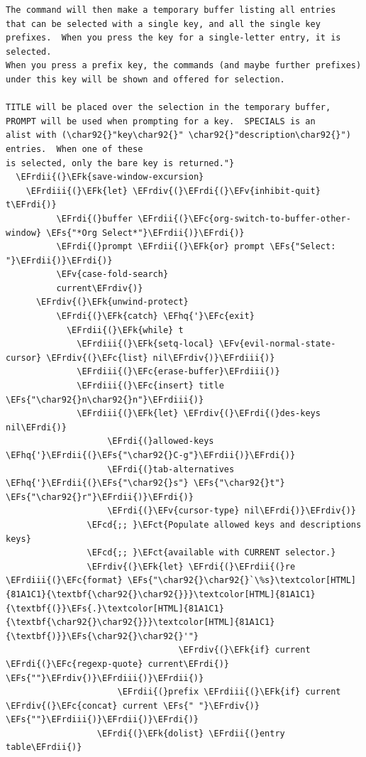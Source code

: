 \documentclass{scrartcl}
\newcommand{\EFk}[1]{\textcolor{EFk}{#1}} %
\newcommand{\EFs}[1]{\textcolor{EFs}{#1}} %
\newcommand{\EFct}[1]{\textcolor{EFct}{#1}} %
\newcommand{\EFc}[1]{\textcolor{EFc}{#1}} %
\newcommand{\EFv}[1]{\textcolor{EFv}{#1}} %
\newcommand{\EFcd}[1]{\textcolor{EFcd}{#1}} %
\newcommand{\EFhq}[1]{#1} %
\newcommand{\EFrdi}[1]{#1} %
\newcommand{\EFrdii}[1]{#1} %
\newcommand{\EFrdiii}[1]{#1} %
\newcommand{\EFrdiv}[1]{#1} %
\begin{document}
\begin{Code}
\begin{Verbatim}[]
The command will then make a temporary buffer listing all entries
that can be selected with a single key, and all the single key
prefixes.  When you press the key for a single-letter entry, it is selected.
When you press a prefix key, the commands (and maybe further prefixes)
under this key will be shown and offered for selection.

TITLE will be placed over the selection in the temporary buffer,
PROMPT will be used when prompting for a key.  SPECIALS is an
alist with (\char92{}"key\char92{}" \char92{}"description\char92{}") entries.  When one of these
is selected, only the bare key is returned."}
  \EFrdii{(}\EFk{save-window-excursion}
    \EFrdiii{(}\EFk{let} \EFrdiv{(}\EFrdi{(}\EFv{inhibit-quit} t\EFrdi{)}
          \EFrdi{(}buffer \EFrdii{(}\EFc{org-switch-to-buffer-other-window} \EFs{"*Org Select*"}\EFrdii{)}\EFrdi{)}
          \EFrdi{(}prompt \EFrdii{(}\EFk{or} prompt \EFs{"Select: "}\EFrdii{)}\EFrdi{)}
          \EFv{case-fold-search}
          current\EFrdiv{)}
      \EFrdiv{(}\EFk{unwind-protect}
          \EFrdi{(}\EFk{catch} \EFhq{'}\EFc{exit}
            \EFrdii{(}\EFk{while} t
              \EFrdiii{(}\EFk{setq-local} \EFv{evil-normal-state-cursor} \EFrdiv{(}\EFc{list} nil\EFrdiv{)}\EFrdiii{)}
              \EFrdiii{(}\EFc{erase-buffer}\EFrdiii{)}
              \EFrdiii{(}\EFc{insert} title \EFs{"\char92{}n\char92{}n"}\EFrdiii{)}
              \EFrdiii{(}\EFk{let} \EFrdiv{(}\EFrdi{(}des-keys nil\EFrdi{)}
                    \EFrdi{(}allowed-keys \EFhq{'}\EFrdii{(}\EFs{"\char92{}C-g"}\EFrdii{)}\EFrdi{)}
                    \EFrdi{(}tab-alternatives \EFhq{'}\EFrdii{(}\EFs{"\char92{}s"} \EFs{"\char92{}t"} \EFs{"\char92{}r"}\EFrdii{)}\EFrdi{)}
                    \EFrdi{(}\EFv{cursor-type} nil\EFrdi{)}\EFrdiv{)}
                \EFcd{;; }\EFct{Populate allowed keys and descriptions keys}
                \EFcd{;; }\EFct{available with CURRENT selector.}
                \EFrdiv{(}\EFk{let} \EFrdi{(}\EFrdii{(}re \EFrdiii{(}\EFc{format} \EFs{"\char92{}\char92{}`\%s}\textcolor[HTML]{81A1C1}{\textbf{\char92{}\char92{}}}\textcolor[HTML]{81A1C1}{\textbf{(}}\EFs{.}\textcolor[HTML]{81A1C1}{\textbf{\char92{}\char92{}}}\textcolor[HTML]{81A1C1}{\textbf{)}}\EFs{\char92{}\char92{}'"}
                                  \EFrdiv{(}\EFk{if} current \EFrdi{(}\EFc{regexp-quote} current\EFrdi{)} \EFs{""}\EFrdiv{)}\EFrdiii{)}\EFrdii{)}
                      \EFrdii{(}prefix \EFrdiii{(}\EFk{if} current \EFrdiv{(}\EFc{concat} current \EFs{" "}\EFrdiv{)} \EFs{""}\EFrdiii{)}\EFrdii{)}\EFrdi{)}
                  \EFrdi{(}\EFk{dolist} \EFrdii{(}entry table\EFrdii{)}

\end{Verbatim}
\end{Code}
\end{document}
